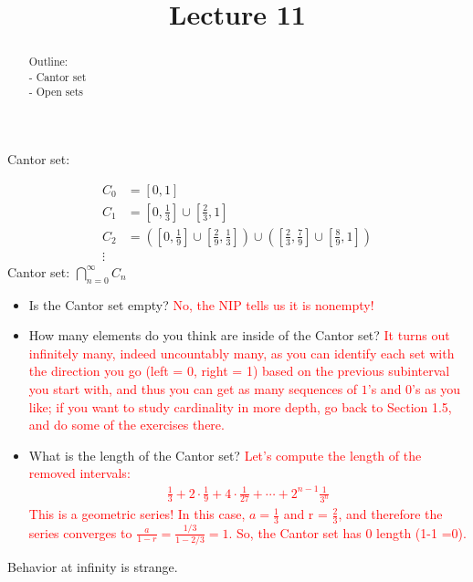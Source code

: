 \documentclass{ximera}
\begin{document}
    \title{Lecture 11}
    
    \begin{abstract}  
    Outline: \\
    - Cantor set \\
    - Open sets
\end{abstract}

\maketitle

Cantor set:

\begin{align*}
C_0 &= [0,1]    \\
C_1 &= [0,\frac13] \cup [\frac23,1]
\\
C_2 &= \left( [0,\frac19] \cup [\frac29,\frac13]\right) \cup \left( [\frac23,\frac79] \cup [\frac89,1]\right)\\
\vdots
\end{align*}
Cantor set: $\bigcap\limits_{n=0}^\infty C_n$

\begin{itemize}
\item Is the Cantor set empty?  \textcolor{red}{No, the NIP tells us it is nonempty!}
\item How many elements do you think are inside of the Cantor set? \textcolor{red}{It turns out infinitely many, indeed uncountably many, as you can identify each set with the direction you go (left = 0, right = 1) based on the previous subinterval you start with, and thus you can get as many sequences of $1$'s and $0$'s as you like; if you want to study cardinality in more depth, go back to Section 1.5, and do some of the exercises there.}
\item What is the length of the Cantor set? \textcolor{red}{ Let's compute the length of the removed intervals:
\begin{align*}
    \frac13 + 2\cdot\frac19 + 4 \cdot \frac{1}{27} + \cdots + 2^{n-1}\frac{1}{3^n}
\end{align*}
This is a geometric series!  In this case, $a = \frac13$ and r = $\frac23$, and therefore the series converges to $\frac{a}{1-r} = \frac{1/3}{1-2/3} = 1$.  So, the Cantor set has $0$ length (1-1 =0).}
\end{itemize}

Behavior at infinity is strange.
\end{document}
